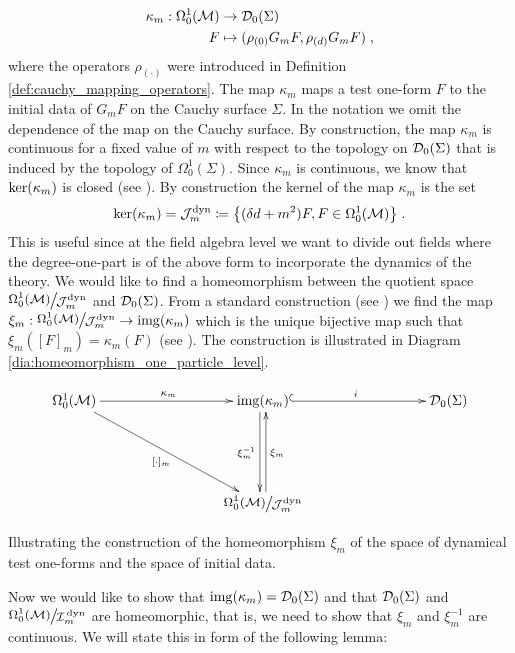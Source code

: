 \begin{align}
	\kappa_m: \Omega^1_0(\mathcal{M}) &\to \mathcal{D}_{0}(\Sigma)  \\
					F &\mapsto (\rho_{(0)} G_m F , \rho_{(d)} G_m F) \;, \notag
\end{align}
where the operators $\rho_{(\cdot)}$ were introduced in Definition \ref{def:cauchy_mapping_operators}. The map $\kappa_m$ maps a test one-form $F$ to the initial data of $G_m F$ on the Cauchy surface $\Sigma$. In the notation we omit the dependence of the map on the Cauchy surface. By construction, the map $\kappa_m$ is continuous for a fixed value of $m$ with respect to the topology on $\mathcal{D}_{0}(\Sigma)$ that is induced by the topology of $\Omega^1_0(\Sigma)$.
Since $\kappa_m$ is continuous, we know that $\textrm{ker}{\left(\kappa_m\right)}$ is closed (see \cite[34-36 ]{treves}). By construction the kernel of the map $\kappa_m$ is the set
\begin{align}
	\textrm{ker}{\left(\kappa_m\right)} = \mathcal{J}_m^\text{dyn} \coloneqq \big\{ (\delta d + m^2) F , F \in \Omega^1_0(\mathcal{M}) \big\} \;.
\end{align}
This is useful since at the field algebra level we want to divide out fields where the degree-one-part is of the above form to incorporate the dynamics of the theory.
We would like to find a homeomorphism between the quotient space ${\Quotientscale{\Omega^1_0(\M)}{\JMDYN}}$ and $\mathcal{D}_{0}(\Sigma)$.
From a standard construction (see \cite[ibid.]{treves}) we find the map $\xi_m : {\Quotientscale{\Omega^1_0(\M)}{\JMDYN}} \to \IMG{\kappa_m}$ which is the unique bijective map such that $\xi_m([F]_m) = \kappa_m(F)$ (see \cite[16]{treves}). The construction is illustrated in Diagram \ref{dia:homeomorphism_one_particle_level}.
\begin{table}
\begin{displaymath}
\xymatrix @R=20mm @C=30mm
{
	\Omega^1_0 (\M)  \ar[r]^{\kappa_m}   \ar[dr]_{[\cdot]_m}  			&     \IMG{\kappa_m} 													\ar@<-.5ex>[d]_{\xi_m^{-1}} \ar@{^{(}->}[r]^i &   \Dzs \\
	&      {{\Quotientscale{\Omega^1_0(\M)}{\JMDYN}}}          \ar@<-.5ex>[u]_{\xi_m}
}
\end{displaymath}
\caption{Illustrating the construction of the homeomorphism $\xi_m$ of the space of dynamical test one-forms and the space of initial data.}
\label{dia:homeomorphism_one_particle_level}
\end{table}
%
Now we would like to show that $\mathrm{img}{}(\kappa_m) = \mathcal{D}_{0}(\Sigma)$ and that $\mathcal{D}_{0}(\Sigma)$ and ${\Quotientscale{\Omega^1_0(\M)}{\IMDYN}}$ are homeomorphic, that is, we need to show that $\xi_m$ and $\xi_m^{-1}$ are continuous. We will state this in form of the following lemma:
